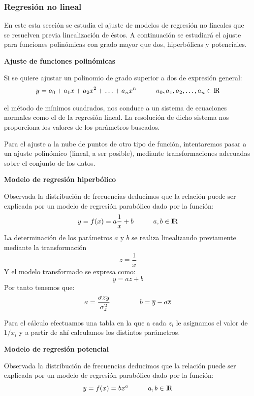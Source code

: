 \documentclass[10pt, a4paper]{article}
\theoremstyle{theorem-style}
\theoremstyle{definition-style}
\theoremstyle{remark-style}
\theoremstyle{example-style}
\theoremstyle{definition-style}
\theoremstyle{remark-style}
\begin{document}
\subsubsection{Regresión no lineal}
	En este esta sección se estudia el ajuste de modelos de regresión no lineales que
se resuelven previa linealización de éstos. A continuación se estudiará el
ajuste para funciones polinómicas con grado mayor que dos, hiperbólicas y
potenciales.

\pagebreak
\vspace{5mm}
\textbf{Ajuste de funciones polinómicas}

Si se quiere ajustar un polinomio de grado superior a dos de expresión general: $$
y = a_0 + a_1x +a_2x^2 + \ldots + a_n x^n\hspace{1cm}a_0, a_1, a_2, \ldots, a_n \in \rm I\!R $$

el método de mínimos cuadrados, nos conduce a un sistema de ecuaciones normales
como el de la regresión lineal. La resolución de dicho sistema nos proporciona
los valores de los parámetros buscados.

Para el ajuste a la nube de puntos de otro tipo de función, intentaremos pasar a
un ajuste polinómico (lineal, a ser posible), mediante transformaciones
adecuadas sobre el conjunto de los datos.

\vspace{5mm}
\textbf{Modelo de regresión hiperbólico}

Observada la distribución de frecuencias deducimos que la relación puede ser
explicada por un modelo de regresión parabólico dado por la función: $$ y= f(x) =
a\frac{1}{x} + b  \hspace{1cm}a,b \in \rm I\!R$$ La determinación de los parámetros $a$ y $b$ se realiza
linealizando previamente mediante la transformación  $$ z = \frac{1}{x} $$ Y el
modelo transformado se expresa como:
$$ y = az +b $$ Por tanto tenemos que: $$ a = \frac{\sigma{zy} }{\sigma_{z}^2} \hspace{1.5cm} b =
\overline{y} - a \overline{z}$$

Para el cálculo efectuamos una tabla en la que a cada $z_i$ le asignamos el
valor de $1/x_i$ y a partir de ahí calculamos los distintos parámetros.

\vspace{5mm}
\textbf{Modelo de regresión potencial}

Observada la distribución de frecuencias deducimos que la relación puede ser
explicada por un modelo de regresión parabólico dado por la función:
$$ y = f(x) = bx^a \hspace{1cm}a,b \in \rm I\!R$$
\end{document}
